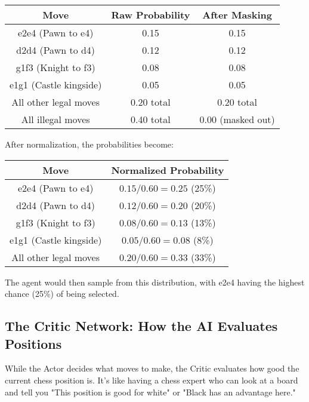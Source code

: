 \documentclass[11pt]{article}
\begin{document}
\begin{center}
\begin{tabular}{|c|c|c|}
\hline
\textbf{Move} & \textbf{Raw Probability} & \textbf{After Masking} \\
\hline
e2e4 (Pawn to e4) & 0.15 & 0.15 \\
\hline
d2d4 (Pawn to d4) & 0.12 & 0.12 \\
\hline
g1f3 (Knight to f3) & 0.08 & 0.08 \\
\hline
e1g1 (Castle kingside) & 0.05 & 0.05 \\
\hline
All other legal moves & 0.20 total & 0.20 total \\
\hline
All illegal moves & 0.40 total & 0.00 (masked out) \\
\hline
\end{tabular}
\end{center}

After normalization, the probabilities become:
\begin{center}
\begin{tabular}{|c|c|}
\hline
\textbf{Move} & \textbf{Normalized Probability} \\
\hline
e2e4 (Pawn to e4) & $0.15 / 0.60 = 0.25$ (25\%) \\
\hline
d2d4 (Pawn to d4) & $0.12 / 0.60 = 0.20$ (20\%) \\
\hline
g1f3 (Knight to f3) & $0.08 / 0.60 = 0.13$ (13\%) \\
\hline
e1g1 (Castle kingside) & $0.05 / 0.60 = 0.08$ (8\%) \\
\hline
All other legal moves & $0.20 / 0.60 = 0.33$ (33\%) \\
\hline
\end{tabular}
\end{center}

The agent would then sample from this distribution, with e2e4 having the highest chance (25\%) of being selected.

\subsection{The Critic Network: How the AI Evaluates Positions}

While the Actor decides what moves to make, the Critic evaluates how good the current chess position is. It's like having a chess expert who can look at a board and tell you "This position is good for white" or "Black has an advantage here."
\end{document}

